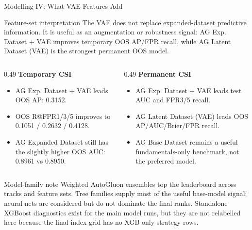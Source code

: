 \documentclass[10pt]{beamer}\usepackage[]{graphicx}\usepackage[table]{xcolor}
\begin{document}

\begin{frame}{Modelling IV: What VAE Features Add}
\scriptsize
\begin{alertblock}{Feature-set interpretation}
\scriptsize
The VAE does not replace expanded-dataset predictive information. It is useful as an augmentation or robustness signal: AG Exp. Dataset + VAE improves temporary OOS AP/FPR recall, while AG Latent Dataset (VAE) is the strongest permanent OOS model.
\end{alertblock}

\vspace{0.15em}
\begin{columns}[T,onlytextwidth]
\begin{column}{0.49\textwidth}
\textbf{Temporary CSI}
\begin{itemize}
  \item AG Exp. Dataset + VAE leads OOS AP: 0.3152.
  \item OOS R@FPR1/3/5 improves to 0.1051 / 0.2632 / 0.4128.
  \item AG Expanded Dataset still has the slightly higher OOS AUC: 0.8961 vs 0.8950.
\end{itemize}
\end{column}
\begin{column}{0.49\textwidth}
\textbf{Permanent CSI}
\begin{itemize}
  \item AG Exp. Dataset + VAE leads test AUC and FPR3/5 recall.
  \item AG Latent Dataset (VAE) leads OOS AP/AUC/Brier/FPR recall.
  \item AG Base Dataset remains a useful fundamentals-only benchmark, not the preferred model.
\end{itemize}
\end{column}
\end{columns}

\vspace{0.15em}
\begin{block}{Model-family note}
\scriptsize
Weighted AutoGluon ensembles top the leaderboard across tracks and feature sets. Tree families supply most of the useful base-model signal; neural nets are considered but do not dominate the final ranks.
Standalone XGBoost diagnostics exist for the main model runs, but they are not relabelled here because the final index grid has no XGB-only strategy rows.
\end{block}
\end{frame}
\end{document}
